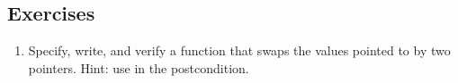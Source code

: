 \subsection*{Exercises}
\begin{enumerate}
\item
Specify, write, and verify a function that swaps the values pointed to
by two  pointers. Hint: use  in the postcondition.
\end{enumerate}


